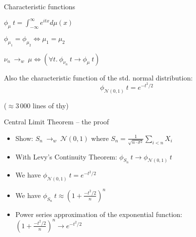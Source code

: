 \documentclass[usepdftitle=false]{beamer}
\begin{document}
\begin{frame}{Characteristic functions} %

\begin{definition}%
\vspace{-1em}
\begin{center} $ \displaystyle \phi_\mu~t = \int_{-\infty}^{\infty} e^{itx} d\mu(x) $ \end{center}
\end{definition}

\pause

\begin{theorem}
\vspace{-1em}
\begin{center} $ \phi_{\mu_1} = \phi_{\mu_2} \Leftrightarrow \mu_1 = \mu_2 $ \end{center} 
\end{theorem}

\pause

\begin{theorem}
\vspace{-1em}
\begin{center} $ \nu_n ~{\longrightarrow}_w~ \mu \Leftrightarrow
  (\forall t.\ \phi_{\nu_n}~t \longrightarrow \phi_\mu~t) $ \end{center}
\end{theorem}

\pause

Also the characteristic function of the std. normal distribution:
\[ \phi_{\mathcal{N}(0, 1)}~t = e^{-t^2/2}\]

($\approx 3\,000$ lines of thy)
\end{frame} %

\begin{frame}{Central Limit Theorem -- the proof} %
\begin{itemize}[<+->]

  \item Show: $S_n ~{\longrightarrow}_w~ \mathcal{N}(0, 1)$ where $S_n = \frac{1}{\sqrt{n\cdot \sigma^2}} \sum_{i < n} X_i$

  \item With Levy's Continuity Theorem:
    $\phi_{S_n}~t \longrightarrow \phi_{\mathcal{N}(0, 1)}~t$
    
  \item We have $\phi_{\mathcal{N}(0, 1)}~t = e^{-t^2/2}$
  
  \item We have $\phi_{S_n}~t \approx
    (1 + \frac{- t^2 / 2}{n})^n$
  
  \item Power series approximation of the exponential function:
    $(1 + \frac{- t^2 / 2}{n})^n \longrightarrow e^{-t^2/2}$ \\

\end{itemize}

\end{frame} %
\end{document}
